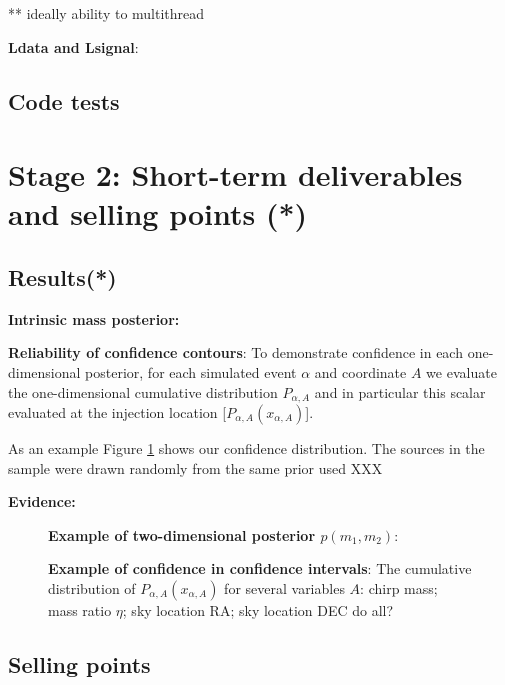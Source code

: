 \documentclass[twocolumn,prd,nofootinbib]{revtex4}
\newcommand\editremark[1]{{\color{red} #1}}
\begin{document}
\begin{widetext}
** ideally ability to multithread


\noindent \textbf{Ldata and Lsignal}: 



\subsection{Code tests}




\section{Stage 2: Short-term deliverables and selling points (*)} 

\subsection{Results(*)}

\noindent \textbf{Intrinsic mass posterior:}

\noindent \textbf{Reliability of confidence contours}: To demonstrate confidence in each one-dimensional posterior, for
each simulated event $\alpha$ and coordinate $A$ we evaluate the one-dimensional cumulative distribution $P_{\alpha,A}$
and in particular this scalar evaluated at the injection location [$P_{\alpha,A}(x_{\alpha,A})$].  

As an example Figure \ref{fig:ShortTermDemo:OneDCumulativeInjectionRecovery} shows our confidence distribution.
The sources in the sample were drawn randomly from the same prior used \editremark{XXX}

\noindent \textbf{Evidence:}



\begin{figure}
\caption{\textbf{Example of two-dimensional posterior $p(m_1,m_2)$}:
}
\end{figure}

\begin{figure}
\caption{\label{fig:ShortTermDemo:OneDCumulativeInjectionRecovery}\textbf{Example of confidence in confidence
    intervals}: The cumulative distribution of $P_{\alpha,A}(x_{\alpha,A})$ for several variables $A$: chirp mass; mass
  ratio $\eta$; sky location RA; sky location DEC \editremark{do all?}
}
\end{figure}

\subsection{Selling points}


\end{widetext}
\end{document}
